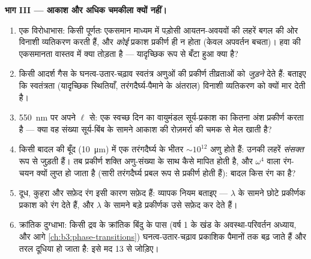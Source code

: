 \begin{problem}
\medskip\noindent\textbf{भाग III --- आकाश और अधिक चमकीला क्यों
नहीं।}
\begin{enumerate}[resume]
  \item एक विरोधाभास: किसी पूर्णतः एकसमान माध्यम में पड़ोसी
        आयतन-अवयवों की लहरें बगल की ओर विनाशी व्यतिकरण करती हैं,
        और \emph{कोई} प्रकाश प्रकीर्ण ही न होता (केवल अपवर्तन
        बचता)। हवा की एकसमानता वास्तव में क्या तोड़ता है --- यादृच्छिक
        रूप से बँटा हुआ क्या है?
  \item किसी आदर्श गैस के घनत्व-उतार-चढ़ाव स्वतंत्र अणुओं की प्रकीर्ण
        तीव्रताओं को \emph{जुड़ने} देते हैं: बताइए कि
        स्वतंत्रता (यादृच्छिक स्थितियाँ, तरंगदैर्घ्य-पैमाने के
        अंतराल) विनाशी व्यतिकरण को क्यों मार देती है।
  \item \qty{550}{nm} पर अपने $\ell$ से: एक स्वच्छ दिन का
        वायुमंडल सूर्य-प्रकाश का कितना अंश प्रकीर्ण करता है --- क्या
        वह संख्या सूर्य-बिंब के सामने आकाश की रोज़मर्रा की चमक से मेल
        खाती है?
  \item किसी बादल की बूँद (\qty{10}{\micro m}) में एक तरंगदैर्घ्य के
        भीतर $\sim10^{12}$ अणु होते हैं: उनकी लहरें
        \emph{संसक्त} रूप से जुड़ती हैं। तब प्रकीर्ण शक्ति अणु-संख्या
        के साथ कैसे मापित होती है, और $\omega^4$ वाला
        रंग-चयन क्यों लुप्त हो जाता है (सारी तरंगदैर्घ्य प्रबल रूप से
        प्रकीर्ण होती हैं): बादल किस रंग का है?
  \item दूध, कुहरा और सफ़ेद रंग इसी कारण सफ़ेद हैं: व्यापक नियम
        बताइए --- $\lambda$ के सामने छोटे प्रकीर्णक प्रकाश को रंग देते
        हैं, और $\lambda$ के सामने बड़े प्रकीर्णक उसे सफ़ेद कर देते हैं।
  \item क्रांतिक दुग्धाभा: किसी द्रव के क्रांतिक बिंदु के पास
        (वर्ष 1 के खंड के अवस्था-परिवर्तन अध्याय, और आगे
        \cref{ch:b3:phase-transitions}) घनत्व-उतार-चढ़ाव प्रकाशिक पैमानों तक बढ़ जाते हैं और
        तरल दूधिया हो जाता है: इसे मद 13 से जोड़िए।
\end{enumerate}


\end{problem}
